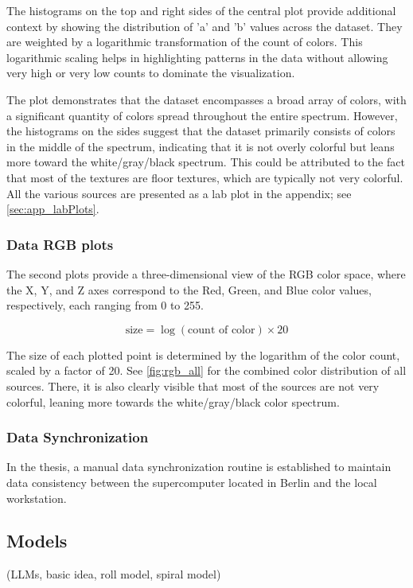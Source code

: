    The histograms on the top and right sides of the central plot provide additional context by showing the distribution of 'a' and 'b' values across the dataset. They are weighted by a logarithmic transformation of the count of colors. This logarithmic scaling helps in highlighting patterns in the data without allowing very high or very low counts to dominate the visualization.

    The plot demonstrates that the dataset encompasses a broad array of colors, with a significant quantity of colors spread throughout the entire spectrum. However, the histograms on the sides suggest that the dataset primarily consists of colors in the middle of the spectrum, indicating that it is not overly colorful but leans more toward the white/gray/black spectrum. This could be attributed to the fact that most of the textures are floor textures, which are typically not very colorful. All the various sources are presented as a lab plot in the appendix; see \autoref{sec:app_labPlots}.

    \subsubsection{Data RGB plots}

    The second plots provide a three-dimensional view of the RGB color space, where the X, Y, and Z axes correspond to the Red, Green, and Blue color values, respectively, each ranging from 0 to 255. 

    \[
    \text{size} = \log(\text{count of color}) \times 20
    \]

    The size of each plotted point is determined by the logarithm of the color count, scaled by a factor of 20. See \autoref{fig:rgb_all} for the combined color distribution of all sources. There, it is also clearly visible that most of the sources are not very colorful, leaning more towards the white/gray/black color spectrum.

    \subsubsection{Data Synchronization}

    In the thesis, a manual data synchronization routine is established to maintain data consistency between the supercomputer located in Berlin and the local workstation.

\subsection{Models}
    (LLMs, basic idea, roll model, spiral model)

